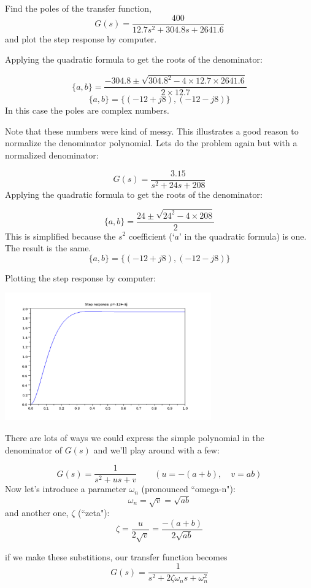 \begin{ExampleSmall}
Find the poles of the transfer function,
\[
G(s) = \frac{400}{12.7s^2 + 304.8s + 2641.6}
\]
and plot the step response by computer.

\vspace{0.25in}
Applying the quadratic formula to get the roots of the denominator:

\[
\{a,b\} = \frac {-304.8 \pm \sqrt{304.8^2 -4\times12.7\times2641.6}}{2\times 12.7}
\]
\[
\{a,b\} = \{(-12+j8),(-12-j8)\}
\]
In this case the poles are complex numbers.

Note that these numbers were kind of messy. This illustrates a good reason to normalize the denominator polynomial.   Lets do the problem again but with a normalized denominator:

\[
G(s) = \frac{3.15}{s^2 + 24s + 208}
\]
Applying the quadratic formula to get the roots of the denominator:

\[
\{a,b\} = \frac {24 \pm \sqrt{24^2 -4\times208}}{2}
\]
This is simplified because the $s^2$ coefficient (`$a$' in the quadratic formula) is one.  The result is the same.
\[
\{a,b\} = \{(-12+j8),(-12-j8)\}
\]

Plotting the step response by computer:

\includegraphics[width=3.5in]{figs05/cplxstepa.png}
\end{ExampleSmall}


There are lots of ways we could express the simple polynomial in the denominator of $G(s)$ and we'll play around with a few:

\[
G(s) = \frac{1}{s^2+us+v} \qquad (u = -(a+b),\quad v= ab)
\]
Now let's introduce a parameter $\omega_n$ (pronounced ``omega-n"):
\[
\omega_n  = \sqrt{v} = \sqrt{ab}
\]
and another one, $\zeta$ (``zeta"):
\[
\zeta = \frac{u}{2\sqrt{v}} = \frac{-(a+b)}{2\sqrt{ab}}
\]

if we make these substitions, our transfer function becomes
\[
G(s) = \frac{1}{s^2 + 2\zeta\omega_n s+\omega_n^2}
\]

